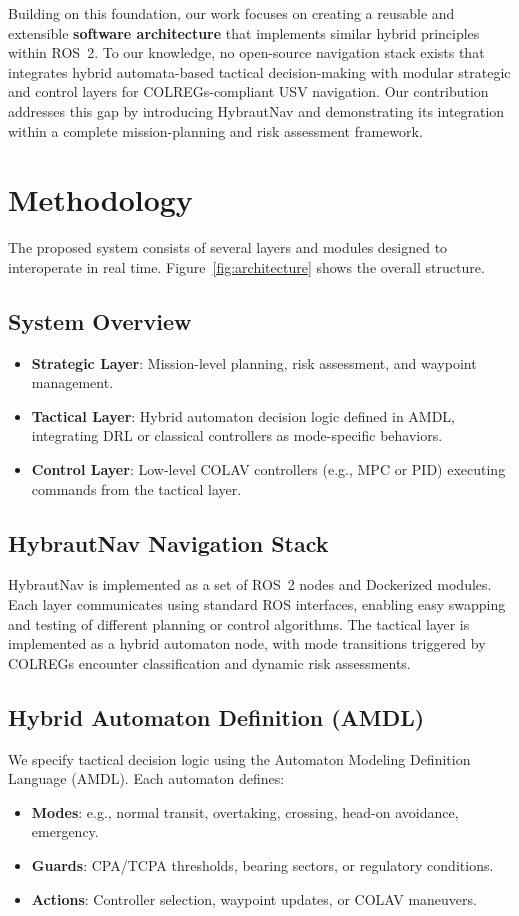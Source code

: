 \documentclass{article}
\begin{document}
Building on this foundation, our work focuses on creating a reusable and extensible \textbf{software architecture} that implements similar hybrid principles within ROS~2. To our knowledge, no open-source navigation stack exists that integrates hybrid automata-based tactical decision-making with modular strategic and control layers for COLREGs-compliant USV navigation. Our contribution addresses this gap by introducing HybrautNav and demonstrating its integration within a complete mission-planning and risk assessment framework.

\section{Methodology}
The proposed system consists of several layers and modules designed to interoperate in real time. Figure~\ref{fig:architecture} shows the overall structure.

\subsection{System Overview}
\begin{itemize}
    \item \textbf{Strategic Layer}: Mission-level planning, risk assessment, and waypoint management.
    \item \textbf{Tactical Layer}: Hybrid automaton decision logic defined in AMDL, integrating DRL or classical controllers as mode-specific behaviors.
    \item \textbf{Control Layer}: Low-level COLAV controllers (e.g., MPC or PID) executing commands from the tactical layer.
\end{itemize}


\subsection{HybrautNav Navigation Stack}
HybrautNav is implemented as a set of ROS~2 nodes and Dockerized modules. Each layer communicates using standard ROS interfaces, enabling easy swapping and testing of different planning or control algorithms. The tactical layer is implemented as a hybrid automaton node, with mode transitions triggered by COLREGs encounter classification and dynamic risk assessments.

\subsection{Hybrid Automaton Definition (AMDL)}
We specify tactical decision logic using the Automaton Modeling Definition Language (AMDL). Each automaton defines:
\begin{itemize}
    \item \textbf{Modes}: e.g., normal transit, overtaking, crossing, head-on avoidance, emergency.
    \item \textbf{Guards}: CPA/TCPA thresholds, bearing sectors, or regulatory conditions.
    \item \textbf{Actions}: Controller selection, waypoint updates, or COLAV maneuvers.
\end{itemize}
\end{document}
